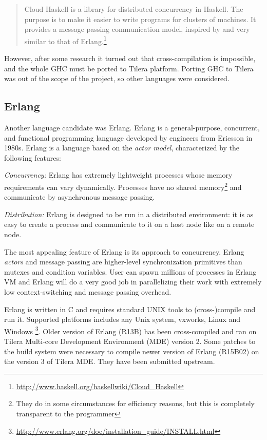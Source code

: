 \documentclass[english,11pt]{l4proj}
\begin{document}
\begin{quote}
    Cloud Haskell is a library for distributed concurrency in Haskell. The
    purpose is to make it easier to write programs for clusters of machines. It
    provides a message passing communication model, inspired by and very similar
    to that of
    Erlang.\footnote{\url{http://www.haskell.org/haskellwiki/Cloud\_Haskell}}
\end{quote}

However, after some research it turned out that cross-compilation is impossible,
and the whole GHC must be ported to Tilera platform. Porting GHC to Tilera was
out of the scope of the project, so other languages were considered.

\subsection{Erlang}

Another language candidate was Erlang. Erlang is a general-purpose, concurrent,
and functional programming language developed by engineers from Ericsson in
1980s. Erlang is a language based on the  {\em actor model}, characterized by
the following features:

{\em Concurrency:} Erlang has extremely lightweight processes whose memory
requirements can vary dynamically. Processes have no shared
memory\footnote{They do in some circumstances for efficiency reasons, but this
is completely transparent to the programmer} and communicate by asynchronous
message passing.

{\em Distribution:} Erlang is designed to be run in a distributed
environment: it is as easy to create a process and communicate to
it on a host node like on a remote node.

The most appealing feature of Erlang is its approach to concurrency. Erlang {\em
actors} and message passing are higher-level synchronization primitives than
mutexes and condition variables. User can spawn millions of processes in Erlang
VM and Erlang will do a very good job in parallelizing their work with extremely
low context-switching and message passing overhead.

Erlang is written in C and requires standard UNIX tools to (cross-)compile and
run it. Supported platforms includes any Unix system, vxworks, Linux and
Windows
\footnote{\url{http://www.erlang.org/doc/installation\_guide/INSTALL.html}}.
Older version of Erlang (R13B) has been cross-compiled and ran on Tilera
Multi-core Development Environment (MDE) version 2. Some patches to the build
system were necessary to compile newer version of Erlang (R15B02) on the
version 3 of Tilera MDE. They have been submitted upstream.
\end{document}
